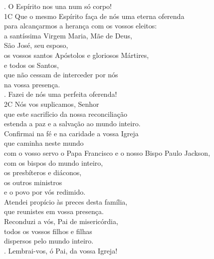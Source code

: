 \documentclass{book}
\begin{document}
\begin{flushleft}
    {\color{VioletRed2} \Rbar.} O Espírito nos una num só corpo!
    \vspace{.2cm} \\
    {\color{VioletRed2}1C} Que o mesmo Espírito faça de nós uma eterna oferenda \\
    para alcançarmos a herança com os vossos eleitos: \\
    a santíssima Virgem Maria, Mãe de Deus, \\
    São José, seu esposo, \\
    os vossos santos Apóstolos e gloriosos Mártires, \\
    e todos os Santos, \\
    que não cessam de interceder por nós \\
    na vossa presença.
    \vspace{.2cm} \\
    {\color{VioletRed2} \Rbar.} Fazei de nós uma perfeita oferenda!
    \vspace{.2cm} \\
    {\color{VioletRed2}2C} Nós vos suplicamos, Senhor \\
    que este sacrifício da nossa reconciliação \\
    estenda a paz e a salvação ao mundo inteiro. \\
    Confirmai na fé e na caridade a vossa Igreja \\
    que caminha neste mundo \\
    com o vosso servo o Papa Francisco e o nosso Bispo Paulo Jackson, \\
    com os bispos do mundo inteiro, \\
    os presbíteros e diáconos, \\
    os outros ministros \\
    e o povo por vós redimido.
    \vspace{.2cm} \\
    Atendei propício às preces desta família, \\
    que reunistes em vossa presença. \\
    Reconduzi a vós, Pai de misericórdia, \\
    todos os vossos filhos e filhas \\
    dispersos pelo mundo inteiro.
    \vspace{.2cm} \\
    {\color{VioletRed2} \Rbar.} Lembrai-vos, ó Pai, da vossa Igreja!
    \vspace{.2cm} \\

\end{flushleft}
\end{document}
